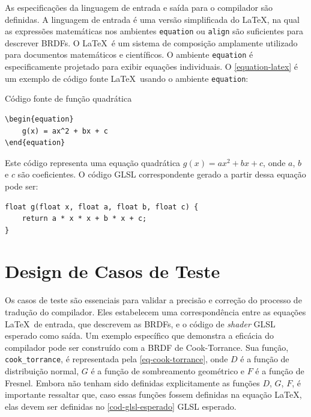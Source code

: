 \documentclass[english, 
               brazil, 
               bsc] %
               {dcomp-abntex2}
\begin{document}
As especificações da linguagem de entrada e saída para o compilador são definidas. A linguagem de entrada é uma versão simplificada do \LaTeX, na qual as expressões matemáticas nos ambientes \texttt{equation} ou \texttt{align} são suficientes para descrever BRDFs. O \LaTeX\  é um sistema de composição amplamente utilizado para documentos matemáticos e científicos. O ambiente \texttt{equation} é especificamente projetado para exibir equações individuais. O \autoref{equation-latex} é um exemplo de código fonte \LaTeX\  usando o ambiente \texttt{equation}:

\begin{codigo}[H]
\caption{Código fonte de função quadrática}
\label{equation-latex}
\begin{lstlisting}
\begin{equation}
    g(x) = ax^2 + bx + c
\end{equation}
\end{lstlisting}
\end{codigo}


Este código representa uma equação quadrática \( g(x) = ax^2 + bx + c \), onde \( a \), \( b \) e \( c \) são coeficientes. O código GLSL correspondente gerado a partir dessa equação pode ser:  
\begin{verbatim}
float g(float x, float a, float b, float c) {
    return a * x * x + b * x + c;
}
\end{verbatim}

\section{Design de Casos de Teste} \label{testes}

Os casos de teste são essenciais para validar a precisão e correção do processo de tradução do compilador. Eles estabelecem uma correspondência entre as equações \LaTeX\ de entrada, que descrevem as BRDFs, e o código de \textit{shader} GLSL esperado como saída. Um exemplo específico que demonstra a eficácia do compilador pode ser construído com a BRDF de Cook-Torrance. Sua função, \texttt{cook\_torrance}, é representada pela \autoref{eq-cook-torrance}, onde \(D\) é a função de distribuição normal, \(G\) é a função de sombreamento geométrico e \(F\) é a função de Fresnel. Embora não tenham sido definidas explicitamente as funções \(D\), \(G\), \(F\), é importante ressaltar que, caso essas funções fossem definidas na equação \LaTeX, elas devem ser definidas no \autoref{cod-glsl-esperado} GLSL esperado.  
\end{document}

